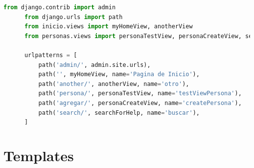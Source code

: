 \documentclass{article}
\begin{document}
    \begin{lstlisting}[language=python]
      from django.contrib import admin
      from django.urls import path
      from inicio.views import myHomeView, anotherView
      from personas.views import personaTestView, personaCreateView, searchForHelp

      urlpatterns = [
          path('admin/', admin.site.urls),
          path('', myHomeView, name='Pagina de Inicio'),
          path('another/', anotherView, name='otro'),
          path('persona/', personaTestView, name='testViewPersona'),
          path('agregar/', personaCreateView, name='createPersona'),
          path('search/', searchForHelp, name='buscar'),
      ]
    \end{lstlisting}

  

  \section{Templates}
  
\end{document}
